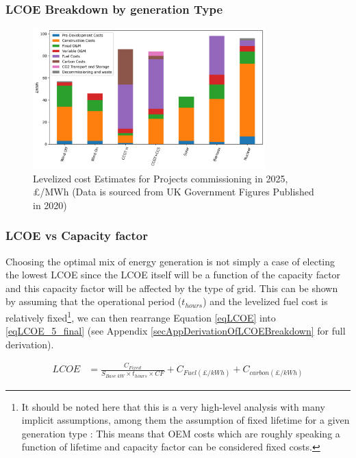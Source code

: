 \documentclass[11pt]{article}
\numberwithin{equation}{section}
\begin{document}
\subsubsection{LCOE Breakdown by generation Type \label{LCOEBreakdown}}
\label{sec:org2e40b6c}
\begin{figure}[H]
\centering
\includegraphics[width=0.8\textwidth]{./.ob-jupyter/8db2ae3ea8d23f67cdfb46f0d78029d25fe124bc.png}
\caption{\label{figLCOEbreakdown}Levelized cost Estimates for Projects commissioning in 2025, £/MWh (Data is sourced from UK Government Figures Published in 2020\cite{DeptEnerLCOE})}
\end{figure}

\subsubsection{LCOE vs Capacity factor \label{secLCOEvsCF}}
\label{sec:orgdf9a7b9}
Choosing the optimal mix of energy generation is not simply a case of electing the lowest LCOE since the LCOE itself will be a function of the capacity factor and this capacity factor will be affected by the type of grid. This can be shown by assuming that the operational period (\(t_{hours}\)) and the levelized fuel cost is relatively fixed\footnote{It should be noted here that this is a very high-level analysis with many implicit assumptions, among them the assumption of fixed lifetime for a given generation type : This means that OEM costs which are roughly speaking a function of lifetime and capacity factor can be considered fixed costs.}, we can then rearrange Equation \ref{eqLCOE} into \ref{eqLCOE_5_final} (see Appendix \ref{secAppDerivationOfLCOEBreakdown} for full derivation).

\begin{align}
\label{eqLCOE_5_final}
LCOE &= \frac{C_{Fixed}}{S_{Base\; kW} \times t_{hours}\times CF}+ C_{Fuel(\pounds/kWh)} + C_{carbon(\pounds/kWh)}
\end{align}
\end{document}
